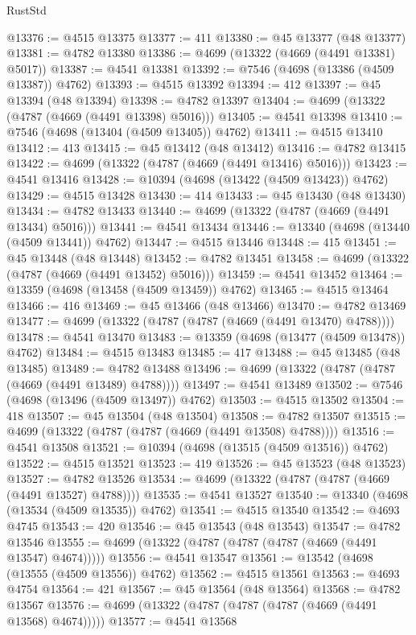\begin{lexlean}{RustStd}
\begin{coremodule}
@13376 := @4515 @13375
@13377 := 411
@13380 := @45 @13377 (@48 @13377)
@13381 := @4782 @13380
@13386 := @4699 (@13322 (@4669 (@4491 @13381) @5017))
@13387 := @4541 @13381
@13392 := @7546 (@4698 (@13386 (@4509 @13387)) @4762)
@13393 := @4515 @13392
@13394 := 412
@13397 := @45 @13394 (@48 @13394)
@13398 := @4782 @13397
@13404 := @4699 (@13322 (@4787 (@4669 (@4491 @13398) @5016)))
@13405 := @4541 @13398
@13410 := @7546 (@4698 (@13404 (@4509 @13405)) @4762)
@13411 := @4515 @13410
@13412 := 413
@13415 := @45 @13412 (@48 @13412)
@13416 := @4782 @13415
@13422 := @4699 (@13322 (@4787 (@4669 (@4491 @13416) @5016)))
@13423 := @4541 @13416
@13428 := @10394 (@4698 (@13422 (@4509 @13423)) @4762)
@13429 := @4515 @13428
@13430 := 414
@13433 := @45 @13430 (@48 @13430)
@13434 := @4782 @13433
@13440 := @4699 (@13322 (@4787 (@4669 (@4491 @13434) @5016)))
@13441 := @4541 @13434
@13446 := @13340 (@4698 (@13440 (@4509 @13441)) @4762)
@13447 := @4515 @13446
@13448 := 415
@13451 := @45 @13448 (@48 @13448)
@13452 := @4782 @13451
@13458 := @4699 (@13322 (@4787 (@4669 (@4491 @13452) @5016)))
@13459 := @4541 @13452
@13464 := @13359 (@4698 (@13458 (@4509 @13459)) @4762)
@13465 := @4515 @13464
@13466 := 416
@13469 := @45 @13466 (@48 @13466)
@13470 := @4782 @13469
@13477 := @4699 (@13322 (@4787 (@4787 (@4669 (@4491 @13470) @4788))))
@13478 := @4541 @13470
@13483 := @13359 (@4698 (@13477 (@4509 @13478)) @4762)
@13484 := @4515 @13483
@13485 := 417
@13488 := @45 @13485 (@48 @13485)
@13489 := @4782 @13488
@13496 := @4699 (@13322 (@4787 (@4787 (@4669 (@4491 @13489) @4788))))
@13497 := @4541 @13489
@13502 := @7546 (@4698 (@13496 (@4509 @13497)) @4762)
@13503 := @4515 @13502
@13504 := 418
@13507 := @45 @13504 (@48 @13504)
@13508 := @4782 @13507
@13515 := @4699 (@13322 (@4787 (@4787 (@4669 (@4491 @13508) @4788))))
@13516 := @4541 @13508
@13521 := @10394 (@4698 (@13515 (@4509 @13516)) @4762)
@13522 := @4515 @13521
@13523 := 419
@13526 := @45 @13523 (@48 @13523)
@13527 := @4782 @13526
@13534 := @4699 (@13322 (@4787 (@4787 (@4669 (@4491 @13527) @4788))))
@13535 := @4541 @13527
@13540 := @13340 (@4698 (@13534 (@4509 @13535)) @4762)
@13541 := @4515 @13540
@13542 := @4693 @4745
@13543 := 420
@13546 := @45 @13543 (@48 @13543)
@13547 := @4782 @13546
@13555 := @4699 (@13322 (@4787 (@4787 (@4787 (@4669 (@4491 @13547) @4674)))))
@13556 := @4541 @13547
@13561 := @13542 (@4698 (@13555 (@4509 @13556)) @4762)
@13562 := @4515 @13561
@13563 := @4693 @4754
@13564 := 421
@13567 := @45 @13564 (@48 @13564)
@13568 := @4782 @13567
@13576 := @4699 (@13322 (@4787 (@4787 (@4787 (@4669 (@4491 @13568) @4674)))))
@13577 := @4541 @13568

\end{coremodule}
\end{lexlean}
